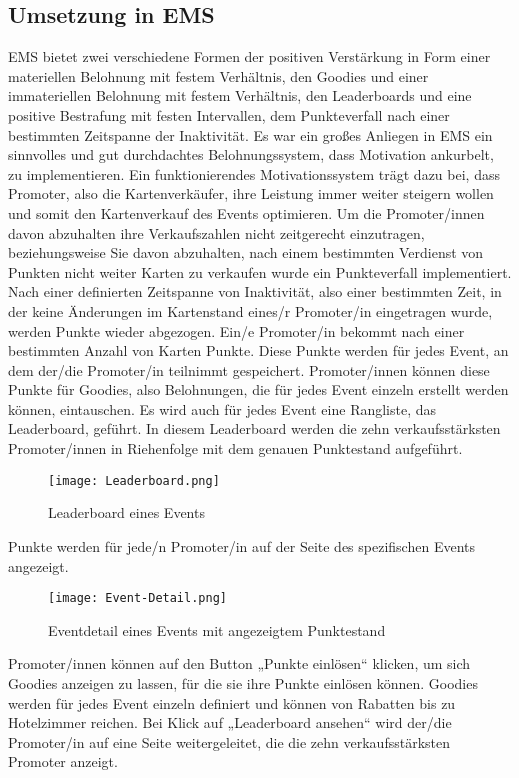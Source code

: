 \subsection{Umsetzung in EMS}
EMS bietet zwei verschiedene Formen der positiven Verstärkung in Form einer materiellen Belohnung mit festem Verhältnis, den Goodies und einer immateriellen Belohnung mit festem Verhältnis, den Leaderboards und eine positive Bestrafung mit festen Intervallen, dem Punkteverfall nach einer bestimmten Zeitspanne der Inaktivität.
Es war ein großes Anliegen in EMS ein sinnvolles und gut durchdachtes Belohnungssystem, dass Motivation ankurbelt, zu implementieren.
Ein funktionierendes Motivationssystem trägt dazu bei, dass Promoter, also die Kartenverkäufer, ihre Leistung immer weiter steigern wollen und somit den Kartenverkauf des Events optimieren. 
Um die Promoter/innen davon abzuhalten ihre Verkaufszahlen nicht zeitgerecht einzutragen, beziehungsweise Sie davon abzuhalten, nach einem bestimmten Verdienst von Punkten nicht weiter Karten zu verkaufen wurde ein Punkteverfall implementiert. Nach einer definierten Zeitspanne von Inaktivität, also einer bestimmten Zeit, in der keine Änderungen im Kartenstand eines/r Promoter/in eingetragen wurde, werden Punkte wieder abgezogen.
Ein/e Promoter/in bekommt nach einer bestimmten Anzahl von Karten Punkte. Diese Punkte werden für jedes Event, an dem der/die Promoter/in teilnimmt gespeichert. 
Promoter/innen können diese Punkte für Goodies, also Belohnungen, die für jedes Event einzeln erstellt werden können, eintauschen. 
Es wird auch für jedes Event eine Rangliste, das Leaderboard, geführt. In diesem Leaderboard werden die zehn verkaufsstärksten Promoter/innen in Riehenfolge mit dem genauen Punktestand aufgeführt. 
\begin{center}
\begin{figure}[H]
	\centering
	\texttt{[image: Leaderboard.png]}
	\caption{Leaderboard eines Events}
\end{figure}
\end{center}
Punkte werden für jede/n Promoter/in auf der Seite des spezifischen Events angezeigt.
\newpage 
\begin{center}
\begin{figure}[H]
	\centering
	\texttt{[image: Event-Detail.png]}
	\caption{Eventdetail eines Events mit angezeigtem Punktestand}
\end{figure}
\end{center}
Promoter/innen können auf den Button „Punkte einlösen“ klicken, um sich Goodies anzeigen zu lassen, für die sie ihre Punkte einlösen können. Goodies werden für jedes Event einzeln definiert und können von Rabatten bis zu Hotelzimmer reichen.
Bei Klick auf „Leaderboard ansehen“ wird der/die Promoter/in auf eine Seite weitergeleitet, die die zehn verkaufsstärksten Promoter anzeigt. 